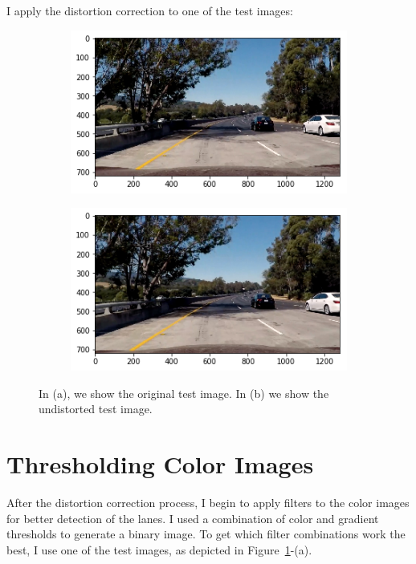 \documentclass[draftcls,onecolumn,12pt]{IEEEtran}
\theoremstyle{plain}
\theoremstyle{plain}
\begin{document}
I apply the distortion correction to one of the test images:
\begin{figure}[htb!!]
    \centering
   \begin{subfigure}[t]{0.45\textwidth}
        \includegraphics[width=\textwidth]{./figures/test_image.png}\\
        \caption{}
    \end{subfigure}
    \hspace{-0.5cm}
    \begin{subfigure}[t]{0.45\textwidth}
        \includegraphics[width=\textwidth]{./figures/test_image_undistort.png}\\
        \caption{}
    \end{subfigure}
    \caption{In (a), we show the original test image. In (b) we show the undistorted test image.}\label{Fig:TestImage}
\end{figure}

\section{Thresholding Color Images}
After the distortion correction process, I begin to apply filters to the color images for better detection of the lanes. I used a combination of color and gradient thresholds to generate a binary image. To get which filter combinations work the best, I use one of the test images, as depicted in Figure~\ref{Fig:TestImage}-(a). 
\end{document}
